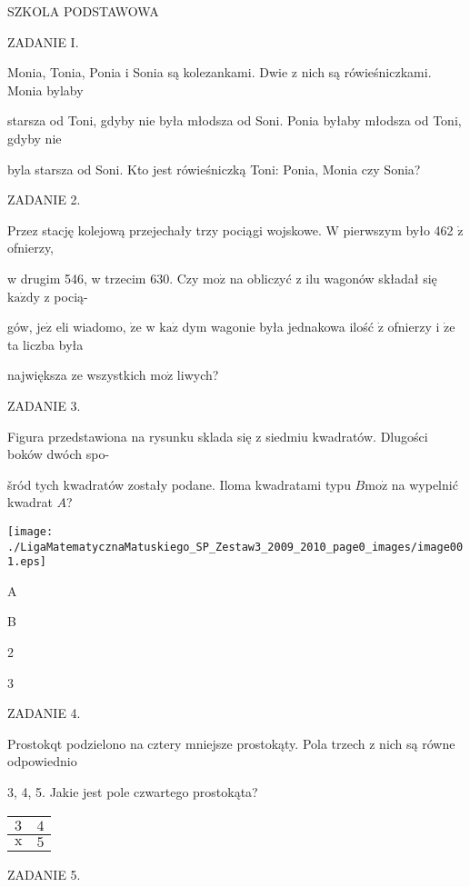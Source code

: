 \documentclass[a4paper,12pt]{article}
\begin{document}
SZKOLA PODSTAWOWA

ZADANIE I.

Monia, Tonia, Ponia i Sonia są kolezankami. Dwie z nich są rówieśniczkami. Monia bylaby

starsza od Toni, gdyby nie była młodsza od Soni. Ponia byłaby młodsza od Toni, gdyby nie

byla starsza od Soni. Kto jest rówieśniczką Toni: Ponia, Monia czy Sonia?

ZADANIE 2.

Przez stację kolejową przejechały trzy pociągi wojskowe. $\mathrm{W}$ pierwszym było 462 $\dot{\mathrm{z}}$ ofnierzy,

w drugim 546, w trzecim 630. Czy $\mathrm{m}\mathrm{o}\dot{\mathrm{z}}$ na obliczyć z ilu wagonów składał się $\mathrm{k}\mathrm{a}\dot{\mathrm{z}}\mathrm{d}\mathrm{y}$ z pocią-

gów, $\mathrm{j}\mathrm{e}\dot{\mathrm{z}}$ eli wiadomo, $\dot{\mathrm{z}}\mathrm{e}$ w $\mathrm{k}\mathrm{a}\dot{\mathrm{z}}$ dym wagonie była jednakowa ilość $\dot{\mathrm{z}}$ ofnierzy i $\dot{\mathrm{z}}\mathrm{e}$ ta liczba była

największa ze wszystkich $\mathrm{m}\mathrm{o}\dot{\mathrm{z}}$ liwych?

ZADANIE 3.

Figura przedstawiona na rysunku sklada się z siedmiu kwadratów. Dlugości boków dwóch spo-

šród tych kwadratów zostały podane. Iloma kwadratami typu $B\mathrm{m}\mathrm{o}\dot{\mathrm{z}}$ na wypelnić kwadrat $A$?
\begin{center}
\texttt{[image: ./LigaMatematycznaMatuskiego\_SP\_Zestaw3\_2009\_2010\_page0\_images/image001.eps]}
\end{center}
A

B

2

3

ZADANIE 4.

Prostokqt podzielono na cztery mniejsze prostokąty. Pola trzech z nich są równe odpowiednio

3, 4, 5. Jakie jest pole czwartego prostokąta?
\begin{center}
\begin{tabular}{|l|l|}
\hline
\multicolumn{1}{|l|}{$3$}&	\multicolumn{1}{|l|}{ $4$}	\\
\hline
\multicolumn{1}{|l|}{ $\mathrm{x}$}&	\multicolumn{1}{|l|}{ $5$}	\\
\hline
\end{tabular}

\end{center}
ZADANIE 5.
\end{document}
